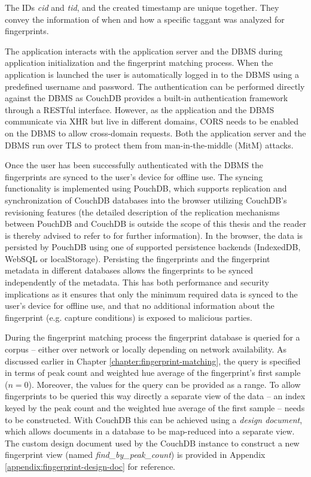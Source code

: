 \documentclass[thesis.tex]{subfiles}
\begin{document}
\noindent The IDs \emph{cid} and \emph{tid}, and the created timestamp are unique together. They convey the information of when and how a specific taggant was analyzed for fingerprints.

The application interacts with the application server and the DBMS during application initialization and the fingerprint matching process. When the application is launched the user is automatically logged in to the DBMS using a predefined username and password. The authentication can be performed directly against the DBMS as CouchDB provides a built-in authentication framework through a RESTful interface. However, as the application and the DBMS communicate via XHR but live in different domains, CORS needs to be enabled on the DBMS to allow cross-domain requests. Both the application server and the DBMS run over TLS to protect them from man-in-the-middle (MitM) attacks.

Once the user has been successfully authenticated with the DBMS the fingerprints are synced to the user's device for offline use. The syncing functionality is implemented using PouchDB, which supports replication and synchronization of CouchDB databases into the browser utilizing CouchDB's revisioning features (the detailed description of the replication mechanisms between PouchDB and CouchDB is outside the scope of this thesis and the reader is thereby advised to refer to \cite{pouch-couch-replication} for further information). In the browser, the data is persisted by PouchDB using one of supported persistence backends (IndexedDB, WebSQL or localStorage). Persisting the fingerprints and the fingerprint metadata in different databases allows the fingerprints to be synced independently of the metadata. This has both performance and security implications as it ensures that only the minimum required data is synced to the user's device for offline use, and that no additional information about the fingerprint (e.g. capture conditions) is exposed to malicious parties.

During the fingerprint matching process the fingerprint database is queried for a corpus -- either over network or locally depending on network availability. As discussed earlier in Chapter \ref{chapter:fingerprint-matching}, the query is specified in terms of peak count and weighted hue average of the fingerprint's first sample ($n=0$). Moreover, the values for the query can be provided as a range. To allow fingerprints to be queried this way directly a separate view of the data -- an index keyed by the peak count and the weighted hue average of the first sample -- needs to be constructed. With CouchDB this can be achieved using a \emph{design document}, which allows documents in a database to be map-reduced into a separate view. The custom design document used by the CouchDB instance to construct a new fingerprint view (named \emph{find\_by\_peak\_count}) is provided in Appendix \ref{appendix:fingerprint-design-doc} for reference.
\end{document}

